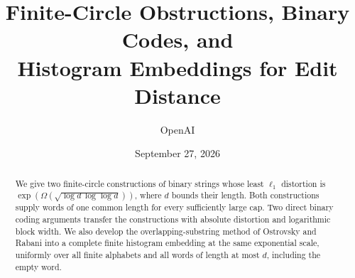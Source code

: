 \documentclass[11pt]{article}
\title{Finite-Circle Obstructions, Binary Codes, and\\
Histogram Embeddings for Edit Distance}
\author{OpenAI}
\date{September 27, 2026}
\theoremstyle{definition}
\theoremstyle{remark}
\begin{document}
\maketitle
\begin{abstract}
We give two finite-circle constructions of binary strings whose least
$\ell_1$ distortion is
$\exp(\Omega(\sqrt{\log d\,\log\log d}))$, where $d$ bounds their length.
Both constructions supply words of one common length for every sufficiently
large cap. Two direct binary coding arguments transfer the constructions
with absolute distortion and logarithmic block width. We also develop the
overlapping-substring method of Ostrovsky and Rabani into a complete finite
histogram embedding at the same exponential scale, uniformly over all
finite alphabets and all words of length at most $d$, including the empty word.
\end{abstract}










\end{document}
